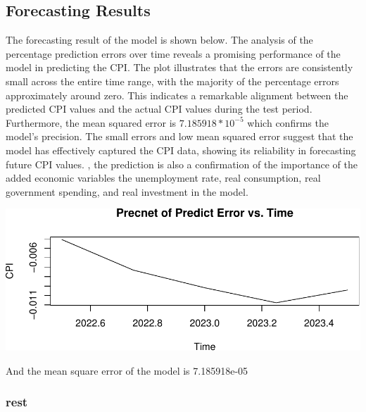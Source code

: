 \documentclass[
  man,floatsintext,
  man]{apa6}
\begin{document}
\hypertarget{forecasting-results}{%
\subsection{Forecasting Results}\label{forecasting-results}}

The forecasting result of the model is shown below. The analysis of the percentage prediction errors over time reveals a promising performance of the model in predicting the CPI. The plot illustrates that the errors are consistently small across the entire time range, with the majority of the percentage errors approximately around zero. This indicates a remarkable alignment between the predicted CPI values and the actual CPI values during the test period. Furthermore, the mean squared error is \(7.185918*10^{-5}\) which confirms the model's precision. The small errors and low mean squared error suggest that the model has effectively captured the CPI data, showing its reliability in forecasting future CPI values. , the prediction is also a confirmation of the importance of the added economic variables the unemployment rate, real consumption, real government spending, and real investment in the model.

\includegraphics{stat429_group2_final_proj_files/figure-latex/unnamed-chunk-7-1.pdf}

And the mean square error of the model is 7.185918e-05

\hypertarget{rest}{%
\subsubsection{rest}\label{rest}}
\end{document}

